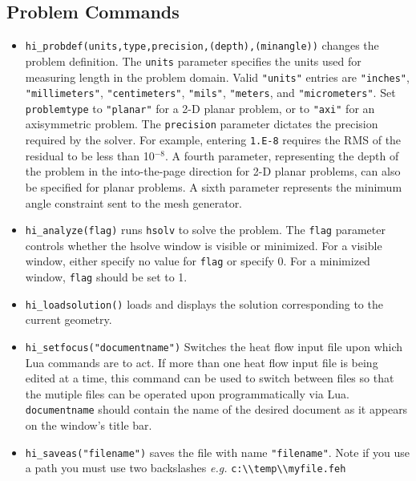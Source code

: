 \subsection{Problem Commands}

\begin{itemize}
\item {\tt hi\_probdef(units,type,precision,(depth),(minangle))} changes the problem
definition. The \texttt{units} parameter specifies the units used
for measuring length in the problem domain. Valid \texttt{"units"}
entries are
\texttt{"inches"}, \texttt{"millimeters"}, \texttt{"centimeters"},
\texttt{"mils"}, \texttt{"meters}, and \texttt{"micrometers"}. Set
\texttt{problemtype} to \texttt{"planar"} for a 2-D planar problem, or to
\texttt{"axi"} for an axisymmetric problem. The \texttt{precision} parameter
dictates the precision required by the solver. For example, entering
\texttt{1.E-8} requires the RMS of the residual to be less than 10$^{ - 8}$.
A fourth parameter, representing the depth of the problem in the
into-the-page direction for 2-D planar problems, can also be specified
for planar problems. A sixth parameter represents the minimum angle constraint sent to the mesh generator.

\item {\tt hi\_analyze(flag)} runs \texttt{hsolv} to solve the problem. The
\texttt{flag} parameter controls whether the hsolve window is visible or
minimized. For a visible window, either specify no value for
\texttt{flag} or specify 0. For a minimized window, \texttt{flag}
should be set to 1.

\item {\tt hi\_loadsolution()} loads and displays the solution corresponding to the
current geometry.

\item {\tt hi\_setfocus("documentname")} Switches the
heat flow input file upon which Lua commands are to act. If
more than one heat flow input file is being edited at a time,
this command can be used to switch between files so that the
mutiple files can be operated upon programmatically via Lua. {\tt
documentname} should contain the name of the desired document as
it appears on the window's title bar.

\item {\tt hi\_saveas("filename")} saves the file with name
\texttt{"filename"}. Note if you use a path you must use two backslashes
{\em e.g.} \verb+c:\\temp\\myfile.feh+

\end{itemize}

